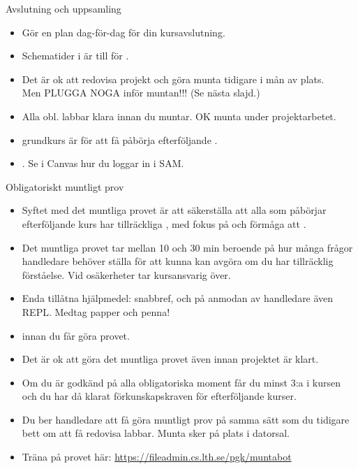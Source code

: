 \ifkompendium\else




\begin{SlideExtra}{Avslutning och uppsamling}

\begin{itemize}\SlideFontSmall

\item Gör en  plan dag-för-dag för din kursavslutning.

\item Schematider i  är till för .

\item Det är ok att redovisa projekt och göra munta tidigare i mån av plats. \\Men PLUGGA NOGA inför muntan!!! (Se nästa slajd.)

\item Alla obl. labbar klara innan du muntar. OK munta under projektarbetet.

\item {} grundkurs är  för att få påbörja efterföljande .

\item {}. Se i Canvas hur du loggar in i SAM.
\end{itemize}

\end{SlideExtra}

\begin{SlideExtra}{Obligatoriskt muntligt prov}
\begin{itemize}\SlideFontSmall
  \item Syftet med det muntliga provet är att säkerställa att alla som påbörjar efterföljande kurs har tillräckliga , med fokus på  och förmåga att  .
  \item Det muntliga provet tar mellan 10 och 30 min beroende på hur många frågor handledare behöver ställa för att kunna kan avgöra om du har tillräcklig förståelse. Vid osäkerheter tar kursansvarig över.
  \item Enda tillåtna hjälpmedel: snabbref, och på anmodan av handledare även REPL. Medtag papper och penna!
  \item {} innan du får göra  provet.
  \item Det är ok att göra det muntliga provet även innan projektet är klart.
  \item Om du är godkänd på alla obligatoriska moment får du minst 3:a i kursen och du har då klarat förkunskapskraven för efterföljande kurser.
  \item Du ber handledare att få göra muntligt prov på samma sätt som du tidigare bett om att få redovisa labbar. Munta sker på plats i datorsal.
  \item Träna på provet här: \url{https://fileadmin.cs.lth.se/pgk/muntabot}
\end{itemize}  
\end{SlideExtra}

